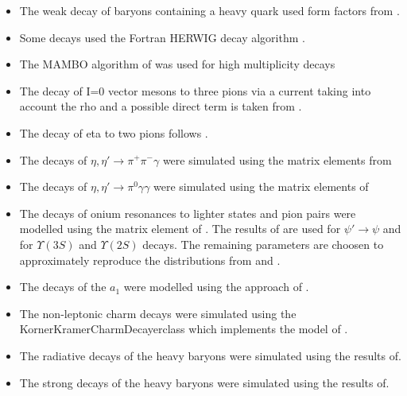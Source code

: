 \documentclass{article}
\begin{document}
\begin{itemize}
\item The weak decay of baryons containing a heavy quark used form factors from \cite{Cheng:1995fe,Cheng:1996cs}.
\item Some decays used the Fortran HERWIG decay algorithm \cite{Corcella:2000bw}.
\item The MAMBO algorithm of \cite{Kleiss:1991rn} was used for high multiplicity decays
\item The decay of I=0 vector mesons to three pions via a current taking into account the rho and a possible direct term is taken from \cite{Aloisio:2003ur}.
\item The decay of eta to two pions follows \cite{Beisert:2003zs,Gormley:1970qz,Tippens:2001fm}.
\item The decays of $\eta,\eta'\to\pi^+\pi^-\gamma$ were simulated using the matrix elements from \cite{Venugopal:1998fq,Holstein:2001bt}
\item The decays of $\eta,\eta'\to\pi^0\gamma\gamma$ were simulated using the matrix elements of \cite{Holstein:2001bt}
\item The decays of onium resonances to lighter states and pion pairs were modelled using the matrix element of \cite{Brown:1975dz}. The results of \cite{Bai:1999mj} are used for $\psi'\to\psi$ and \cite{Cronin-Hennessy:2007sj} for $\Upsilon(3S)$ and $\Upsilon(2S)$ decays. The remaining parameters are choosen to approximately reproduce the distributions from \cite{Aubert:2006bm} and \cite{Adam:2005mr}.
\item The decays of the $a_1$ were modelled using the approach of \cite{Kuhn:1990ad}.

\item The non-leptonic charm decays were simulated using the KornerKramerCharmDecayerclass which implements the model of \cite{Korner:1992wi}.
\item The radiative decays of the heavy baryons were simulated using the results of\cite{Ivanov:1999bk,Ivanov:1998wj}.
\item The strong decays of the heavy baryons were simulated using the results of\cite{Ivanov:1999bk}.
\end{itemize}
\end{document}

